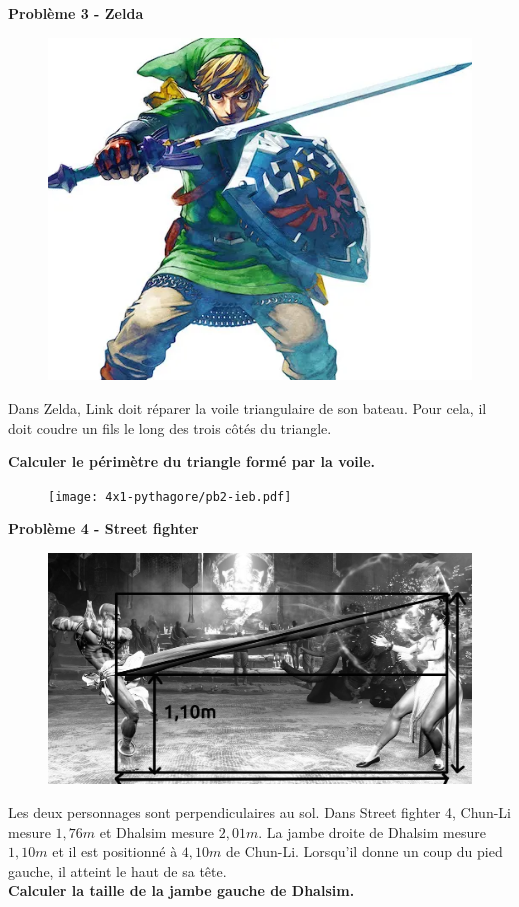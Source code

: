 \begin{multicols}{2} 
  \textbf{Problème 3 - Zelda} \\

  \begin{figure}[H]
    \centering
    \includegraphics[width=0.5\linewidth]{4x1-pythagore/pb1-link.png}
  \end{figure}

  Dans Zelda, Link doit réparer la voile triangulaire de son bateau. Pour cela, il doit coudre un fils le long des trois côtés du triangle. 

  \textbf{Calculer le périmètre du triangle formé par la voile.} \columnbreak

  \begin{figure}[H]
    \centering
    \texttt{[image: 4x1-pythagore/pb2-ieb.pdf]}
  \end{figure}

\end{multicols}

\textbf{Problème 4 - Street fighter} \\

\begin{figure}[H]
  \centering
  \includegraphics[width=0.5\linewidth]{4x1-pythagore/sf4.jpg}
\end{figure}

Les deux personnages sont perpendiculaires au sol. Dans Street fighter 4, Chun-Li mesure $1,76m$ et Dhalsim mesure $2,01m$. La jambe droite de Dhalsim mesure $1,10m$ et il est positionné à $4,10m$ de Chun-Li. Lorsqu'il donne un coup du pied gauche, il atteint le haut de sa tête. \\

\textbf{Calculer la taille de la jambe gauche de Dhalsim.} 

